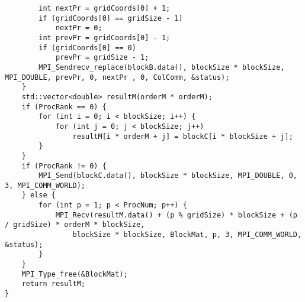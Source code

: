 \documentclass{report}
\begin{document}
\begin{lstlisting}
        int nextPr = gridCoords[0] + 1;
        if (gridCoords[0] == gridSize - 1)
            nextPr = 0;
        int prevPr = gridCoords[0] - 1;
        if (gridCoords[0] == 0)
            prevPr = gridSize - 1;
        MPI_Sendrecv_replace(blockB.data(), blockSize * blockSize, MPI_DOUBLE, prevPr, 0, nextPr , 0, ColComm, &status);
    }
    std::vector<double> resultM(orderM * orderM);
    if (ProcRank == 0) {
        for (int i = 0; i < blockSize; i++) {
            for (int j = 0; j < blockSize; j++)
                resultM[i * orderM + j] = blockC[i * blockSize + j];
        }
    }
    if (ProcRank != 0) {
        MPI_Send(blockC.data(), blockSize * blockSize, MPI_DOUBLE, 0, 3, MPI_COMM_WORLD);
    } else {
        for (int p = 1; p < ProcNum; p++) {
            MPI_Recv(resultM.data() + (p % gridSize) * blockSize + (p / gridSize) * orderM * blockSize,
                blockSize * blockSize, BlockMat, p, 3, MPI_COMM_WORLD, &status);
        }
    }
    MPI_Type_free(&BlockMat);
    return resultM;
}

\end{lstlisting}
\end{document}
